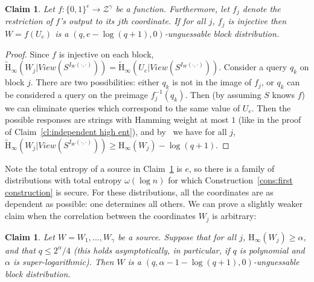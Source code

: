 \documentclass[11pt]{article}
\newcommand{\clref}[1]{\mbox{Claim~\ref{#1}}}
\newcommand{\consref}[1]{\mbox{Construction~\ref{#1}}}
\newcommand{\zo}{\ensuremath{\{0, 1\}}}
\newcommand{\Hoo}{\mathrm{H}_\infty}
\newcommand{\Hav}{\tilde{\mathrm{H}}_\infty}
\newtheorem{claim}[theorem]{Claim}
\begin{document}
\begin{claim}
\label{cl:each block from single seed}
Let $f:\zo^e \rightarrow \mathcal{Z}^\gamma$ be a function.  Furthermore, let $f_j$ denote the restriction of $f$'s output to its $j$th coordinate.  If for all $j$, $f_j$ is injective then $W = f(U_e)$ is a $( q, e - \log (q+1), 0)$-unguessable block distribution.
\end{claim}
\begin{proof}
Since $f$ is injective on each block, $\Hav(W_j | View(S^{I_{W}(\cdot, \cdot)})) = \Hav(U_e | View(S^{I_{W}(\cdot, \cdot)}))$.  Consider a query $q_k$ on block $j$.  There are two possibilities: either $q_k$ is not in the image of $f_j$,  or $q_k$ can be considered a query on the preimage $f_j^{-1}(q_k)$. Then (by assuming $S$ knows $f$) we can eliminate queries which correspond to the same value of $U_e$.  Then the possible responses are strings with Hamming weight at most $1$ (like in the
proof of \clref{cl:independent high ent}),
 and by~\cite[Lemma 2.2]{DBLP:journals/siamcomp/DodisORS08} we have for all $j$, $\Hav(W_j | View(S^{I_{W}(\cdot, \cdot)})) \geq \Hoo(W_j) -\log (q+1)$.
\end{proof}

Note the total entropy of a source in \clref{cl:each block from single seed} is $e$, so there is a family of distributions with total entropy $\omega(\log n)$ for which \consref{cons:first construction} is secure.  For these distributions, all the coordinates are as dependent as possible: one determines all others.
We can prove a slightly weaker claim when the correlation between the coordinates $W_j$ is arbitrary:

\begin{claim}
\label{cl:all blocks entropy}
Let $W = W_1,..., W_\gamma$ be a source.  Suppose that for all $j$, $\Hoo(W_j)\geq \alpha$, and that $q \le 2^{\alpha}/4$ (this holds asymptotically, in particular, if $q$ is polynomial and $\alpha$ is super-logarithmic). Then  $W$ is a $(q, \alpha-1-\log(q+1), 0)$-unguessable block distribution.
\end{claim}
\end{document}
